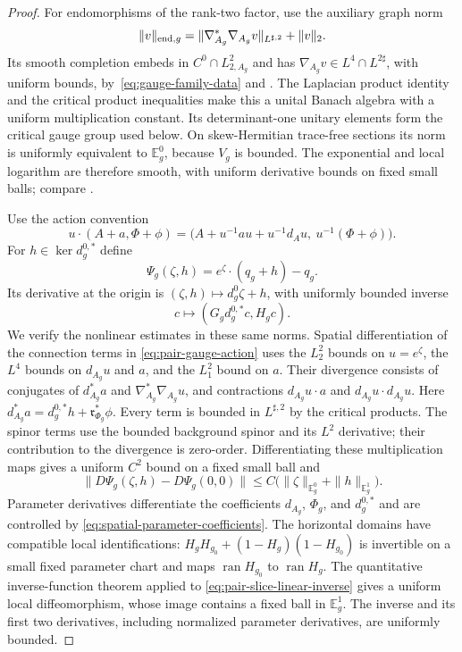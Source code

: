 \documentclass[11pt]{amsart}
\theoremstyle{definition}
\theoremstyle{remark}
\theoremstyle{plain}
\begin{document}
\begin{proof}
For endomorphisms of the rank-two factor, use the auxiliary graph norm
\begin{equation}\label{eq:endomorphism-gauge-norm}
 \|v\|_{{\rm end},g}
 =\|\nabla_{A_g}^*\nabla_{A_g}v\|_{L^{\sharp,2}}+\|v\|_2.
\end{equation}
Its smooth completion embeds in $C^0\cap L^2_{2,A_g}$ and has
$\nabla_{A_g}v\in L^4\cap L^{2\sharp}$, with uniform bounds,
by~\eqref{eq:gauge-family-data} and
\cite[Lemmas~5.3--5.5]{FeehanCritical}.
The Laplacian product identity and the critical product inequalities
make this a unital Banach algebra with a uniform multiplication constant.
Its determinant-one unitary elements form the critical gauge group used
below.
On skew-Hermitian trace-free sections its norm is uniformly equivalent to
$\mathbb E_g^0$, because $V_g$ is bounded.
The exponential and local logarithm are therefore smooth, with uniform
derivative bounds on fixed small balls; compare
\cite[Lemmas~7.2--7.3]{FeehanCritical}.

Use the action convention
\begin{equation}\label{eq:pair-gauge-action}
 u\cdot(A+a,\Phi+\phi)
 =\bigl(A+u^{-1}au+u^{-1}d_Au,\ u^{-1}(\Phi+\phi)\bigr).
\end{equation}
For $h\in\ker d_g^{0,*}$ define
\begin{equation}\label{eq:pair-slice-map}
 \Psi_g(\zeta,h)=e^\zeta\cdot(q_g+h)-q_g.
\end{equation}
Its derivative at the origin is $(\zeta,h)\mapsto d_g^0\zeta+h$,
with uniformly bounded inverse
\begin{equation}\label{eq:pair-slice-linear-inverse}
 c\longmapsto(G_gd_g^{0,*}c,H_gc).
\end{equation}
We verify the nonlinear estimates in these same norms.
Spatial differentiation of the connection terms in
\eqref{eq:pair-gauge-action} uses the $L^2_2$ bounds on $u=e^\zeta$,
the $L^4$ bounds on $d_{A_g}u$ and $a$, and the $L^2_1$ bound on $a$.
Their divergence consists of conjugates of $d_{A_g}^*a$ and
$\nabla_{A_g}^*\nabla_{A_g}u$, and contractions
$d_{A_g}u\cdot a$ and $d_{A_g}u\cdot d_{A_g}u$.
Here
$d_{A_g}^*a=d_g^{0,*}h+\mathfrak r_{\Phi_g}^*\phi$.
Every term is bounded in $L^{\sharp,2}$ by the critical products.
The spinor terms use the bounded background spinor and its $L^2$
derivative; their contribution to the divergence is zero-order.
Differentiating these multiplication maps gives a uniform $C^2$ bound
on a fixed small ball and
\[
 \|D\Psi_g(\zeta,h)-D\Psi_g(0,0)\|
 \leq C\bigl(\|\zeta\|_{\mathbb E_g^0}+\|h\|_{\mathbb E_g^1}\bigr).
\]
Parameter derivatives differentiate the coefficients $d_{A_g}$,
$\Phi_g$, and $d_g^{0,*}$ and are controlled by
\eqref{eq:spatial-parameter-coefficients}.
The horizontal domains have compatible local identifications:
$H_gH_{g_0}+(1-H_g)(1-H_{g_0})$ is invertible on a small fixed
parameter chart and maps $\operatorname{ran}H_{g_0}$ to
$\operatorname{ran}H_g$.
The quantitative inverse-function theorem applied to
\eqref{eq:pair-slice-linear-inverse} gives a uniform local
diffeomorphism, whose image contains a fixed ball in $\mathbb E_g^1$.
The inverse and its first two derivatives, including normalized
parameter derivatives, are uniformly bounded.


\end{proof}
\end{document}
